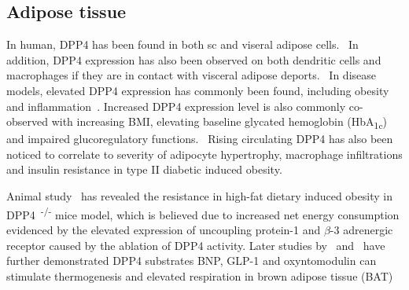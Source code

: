 \subsection{Adipose tissue}
In human, DPP4 has been found in both sc and viseral adipose cells.~\cite{Lamers2011} In addition, DPP4 expression has also been observed on both dendritic cells and macrophages if they are in contact with visceral adipose deports.~\cite{Zhong2013} In disease models, elevated DPP4 expression has commonly been found, including obesity and inflammation~\cite{Zhong2013}. Increased DPP4 expression level is also commonly co-observed with increasing BMI, elevating baseline glycated hemoglobin (HbA\textsubscript{1c})~\cite{2011} and impaired glucoregulatory functions.~\cite{Zhong2013,Sell2013} Rising circulating DPP4 has also been noticed to correlate to severity of adipocyte hypertrophy, macrophage infiltrations and insulin resistance in type II diabetic induced obesity.~\cite{Sell2013}  
\par 
Animal study~\cite{Conarello2003} has revealed the resistance in high-fat dietary induced obesity in DPP4~\textsuperscript{-/-} mice model, which is believed due to increased net energy consumption evidenced by the elevated expression of uncoupling protein-1 and $\beta$-3 adrenergic receptor caused by the ablation of DPP4 activity. Later studies by~\citet{Bordicchia2012} and~\citet{Lockie2012} have further demonstrated DPP4 substrates BNP, GLP-1 and oxyntomodulin can stimulate thermogenesis and elevated  respiration in brown adipose tissue (BAT)